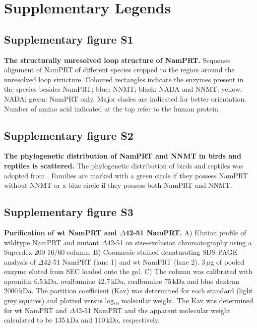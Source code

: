 
\section*{Supplementary Legends}

\subsection*{Supplementary figure S1}

\textbf{The structurally unresolved loop structure of NamPRT.} Sequence alignment of NamPRT of different species cropped to the region around the unresolved loop structure. Coloured rectangles indicate the enzymes present in the species besides NamPRT; blue: NNMT; black: NADA and NNMT; yellow: NADA; green: NamPRT only. Major clades are indicated for better orientation. Number of amino acid indicated at the top refer to the human protein.


\subsection*{Supplementary figure S2}

\textbf{The phylogenetic distribution of NamPRT and NNMT in birds and reptiles is scattered.} The phylogenetic distribution of birds and reptiles was adopted from \cite{Prum2015}. Families are marked with a green circle if they possess NamPRT without NNMT or a blue circle if they possess both NamPRT and NNMT.


\subsection*{Supplementary figure S3}

\textbf{Purification of wt NamPRT and $\Delta$42-51 NamPRT.} A) Elution profile of wildtype NamPRT and mutant $\Delta$42-51 on size-exclusion chromatography using a Superdex 200 16/60 column. B) Coomassie stained denaturating SDS-PAGE analysis of $\Delta$42-51 NamPRT (lane 1) and wt NamPRT (lane 2). 3\,$\mu$g of pooled enzyme eluted from SEC loaded onto the gel. C) The column was calibrated with apronitin 6.5\,kDa, ovalbumine 42.7\,kDa, coalbumine 75\,kDa and blue dextran 2000\,kDa. The partition coefficient (Kav) was determined for each standard (light grey squares) and plotted versus log$_{10}$ molecular weight. The Kav was determined for wt NamPRT and $\Delta$42-51 NamPRT and the apparent molecular weight calculated to be 135\,kDa and 110\,kDa, respectively.


